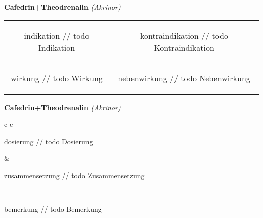 \documentclass[12pt]{beamer}
\begin{document}
\begin{frame}{
    \textbf{Cafedrin+Theodrenalin}
    \textit{(Akrinor)}
}
    \begin{tabular}{c c}
        \begin{beamercolorbox}[wd=\boxwidth\textwidth,ht=\boxheight\textheight,sep=1em]{indikation}
        // todo Indikation
        \end{beamercolorbox} & 
        \begin{beamercolorbox}[wd=\boxwidth\textwidth,ht=\boxheight\textheight,sep=1em]{kontraindikation}
        // todo Kontraindikation 
        \end{beamercolorbox} \\
        \begin{beamercolorbox}[wd=\boxwidth\textwidth,ht=\boxheight\textheight,sep=1em]{wirkung}
        // todo Wirkung
        \end{beamercolorbox} & 
        \begin{beamercolorbox}[wd=\boxwidth\textwidth,ht=\boxheight\textheight,sep=1em]{nebenwirkung}
        // todo Nebenwirkung
        \end{beamercolorbox} \\
    \end{tabular}
\end{frame}

\begin{frame}{
    \textbf{Cafedrin+Theodrenalin}
    \textit{(Akrinor)}
}
    \begin{tabular}{c c}
        \begin{beamercolorbox}[wd=\boxwidth\textwidth,ht=\boxheight\textheight,sep=1em]{dosierung}
        // todo Dosierung
        \end{beamercolorbox} & 
        \begin{beamercolorbox}[wd=\boxwidth\textwidth,ht=\boxheight\textheight,sep=1em]{zusammensetzung}
        // todo Zusammensetzung
        \end{beamercolorbox} \\
        \begin{beamercolorbox}[wd=\textwidth,ht=\boxheight\textheight,sep=1em]{bemerkung}
        // todo Bemerkung
        \end{beamercolorbox} \\
    \end{tabular}
\end{frame}
\end{document}
